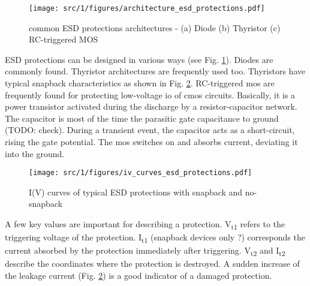 
\begin{figure}[!h]
  \centering
  \texttt{[image: src/1/figures/architecture\_esd\_protections.pdf]}
  \caption{common ESD protections architectures - (a) Diode (b) Thyristor (c) RC-triggered MOS}
  \label{fig:architecture-esd-protection}
\end{figure}

ESD protections can be designed in various ways (see Fig. \ref{fig:architecture-esd-protection}).
Diodes are commonly found.
Thyristor architectures are frequently used too.
Thyristors have typical snapback characteristics as shown in Fig. \ref{fig:iv-curve-esd-protection}.
RC-triggered \gls{mos} are frequently found for protecting low-voltage \gls{io} of \gls{cmos} circuits.
Basically, it is a power transistor activated during the discharge by a resistor-capacitor network.
The capacitor is most of the time the parasitic gate capacitance to ground (TODO: check).
During a transient event, the capacitor acts as a short-circuit, rising the gate potential.
The \gls{mos} switches on and absorbs current, deviating it into the ground.

\begin{figure}[!h]
  \centering
  \texttt{[image: src/1/figures/iv\_curves\_esd\_protections.pdf]}
  \caption{I(V) curves of typical ESD protections with snapback and no-snapback}
  \label{fig:iv-curve-esd-protection}
\end{figure}

A few key values are important for describing a protection.
V\textsubscript{t1} refers to the triggering voltage of the protection.
I\textsubscript{t1} (snapback devices only ?) corresponds the current absorbed by the protection immediately after triggering.
V\textsubscript{t2} and I\textsubscript{t2} describe the coordinates where the protection is destroyed.
A sudden increase of the leakage current (Fig. \ref{fig:iv-curve-esd-protection}) is a good indicator of a damaged protection.


